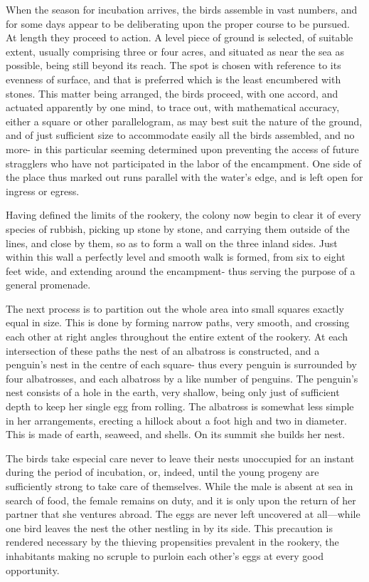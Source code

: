 When the season for incubation arrives, the birds assemble in vast numbers,
and for some days appear to be deliberating upon the proper course to be
pursued. At length they proceed to action. A level piece of ground is selected,
of suitable extent, usually comprising three or four acres, and situated as near
the sea as possible, being still beyond its reach. The spot is chosen with
reference to its evenness of surface, and that is preferred which is the least
encumbered with stones. This matter being arranged, the birds proceed, with one
accord, and actuated apparently by one mind, to trace out, with mathematical
accuracy, either a square or other parallelogram, as may best suit the nature of
the ground, and of just sufficient size to accommodate easily all the birds
assembled, and no more- in this particular seeming determined upon preventing
the access of future stragglers who have not participated in the labor of the
encampment. One side of the place thus marked out runs parallel with the water's
edge, and is left open for ingress or egress. 

Having defined the limits of the rookery, the colony now begin to clear it of
every species of rubbish, picking up stone by stone, and carrying them outside
of the lines, and close by them, so as to form a wall on the three inland sides.
Just within this wall a perfectly level and smooth walk is formed, from six to
eight feet wide, and extending around the encampment- thus serving the purpose
of a general promenade. 

The next process is to partition out the whole area into small squares
exactly equal in size. This is done by forming narrow paths, very smooth, and
crossing each other at right angles throughout the entire extent of the rookery.
At each intersection of these paths the nest of an albatross is constructed, and
a penguin's nest in the centre of each square- thus every penguin is surrounded
by four albatrosses, and each albatross by a like number of penguins. The
penguin's nest consists of a hole in the earth, very shallow, being only just of
sufficient depth to keep her single egg from rolling. The albatross is somewhat
less simple in her arrangements, erecting a hillock about a foot high and two in
diameter. This is made of earth, seaweed, and shells. On its summit she builds
her nest. 

The birds take especial care never to leave their nests unoccupied for an
instant during the period of incubation, or, indeed, until the young progeny are
sufficiently strong to take care of themselves. While the male is absent at sea
in search of food, the female remains on duty, and it is only upon the return of
her partner that she ventures abroad. The eggs are never left uncovered at
all---while one bird leaves the nest the other nestling in by its side. This
precaution is rendered necessary by the thieving propensities prevalent in the
rookery, the inhabitants making no scruple to purloin each other's eggs at every
good opportunity. 


